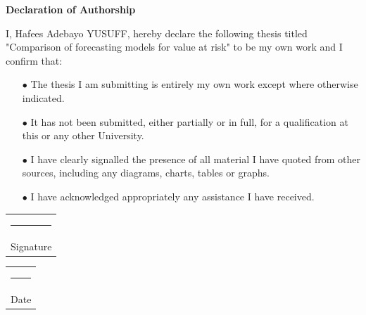 \thispagestyle{empty}

\newpage\null\thispagestyle{empty}\newpage


\begin{titlepage}
	\textbf{\LARGE Declaration of Authorship}\newline\newline
	

		
		I, Hafees Adebayo YUSUFF, hereby declare the following thesis titled "Comparison of forecasting models for value at risk" to be my own work and I confirm that:
			\begin{itemize}
		\item[$\bullet$] The thesis I am submitting is entirely my own work except where otherwise indicated.
		
		\item[$\bullet$] It has not been submitted, either partially or in full, for a qualification at this or any other University.
	
	\item[$\bullet$] I have clearly signalled the presence of all material I have quoted from other sources,
	including any diagrams, charts, tables or graphs.
	
	\item[$\bullet$] I have acknowledged appropriately any assistance I have received.
	
	\end{itemize}
	
	\vspace*{4em}\noindent
	\hfill%
	\begin{tabular}[t]{c}
		\rule{10em}{0.4pt}\\ Signature
	\end{tabular}%
	\hfill%
	\begin{tabular}[t]{c}
		\rule{10em}{0.4pt}\\ Date
	\end{tabular}%
	\hfill\strut


\end{titlepage}

\thispagestyle{empty}

\newpage\null\thispagestyle{empty}\newpage

